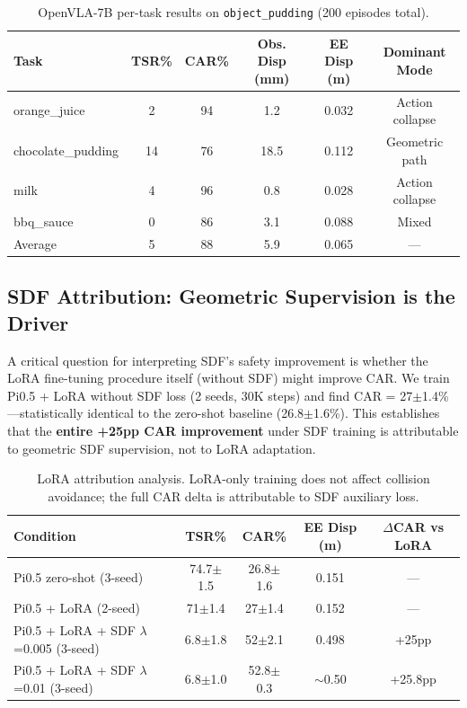 \documentclass[letterpaper]{article}
\begin{document}
\begin{table}[h]
\centering
\caption{OpenVLA-7B per-task results on \texttt{object\_pudding} (200 episodes total).}
\label{tab:openvla_tasks}
\begin{tabular}{lccccc}
\toprule
\textbf{Task} & \textbf{TSR\%} & \textbf{CAR\%} & \textbf{Obs. Disp (mm)} & \textbf{EE Disp (m)} & \textbf{Dominant Mode} \\
\midrule
orange\_juice & 2 & 94 & 1.2 & 0.032 & Action collapse \\
chocolate\_pudding & 14 & 76 & 18.5 & 0.112 & Geometric path \\
milk & 4 & 96 & 0.8 & 0.028 & Action collapse \\
bbq\_sauce & 0 & 86 & 3.1 & 0.088 & Mixed \\
\midrule
Average & 5 & 88 & 5.9 & 0.065 & --- \\
\bottomrule
\end{tabular}
\end{table}

\subsection{SDF Attribution: Geometric Supervision is the Driver}
\label{sec:sdf_training}

A critical question for interpreting SDF's safety improvement is whether the LoRA fine-tuning procedure itself (without SDF) might improve CAR. We train Pi0.5 + LoRA without SDF loss (2 seeds, 30K steps) and find CAR = 27$\pm$1.4\%---statistically identical to the zero-shot baseline (26.8$\pm$1.6\%). This establishes that the \textbf{entire +25pp CAR improvement} under SDF training is attributable to geometric SDF supervision, not to LoRA adaptation.

\begin{table}[h]
\centering
\caption{LoRA attribution analysis. LoRA-only training does not affect collision avoidance; the full CAR delta is attributable to SDF auxiliary loss.}
\label{tab:lora_attribution}
\begin{tabular}{lcccc}
\toprule
\textbf{Condition} & \textbf{TSR\%} & \textbf{CAR\%} & \textbf{EE Disp (m)} & \textbf{$\Delta$CAR vs LoRA} \\
\midrule
Pi0.5 zero-shot (3-seed) & 74.7$\pm$1.5 & 26.8$\pm$1.6 & 0.151 & --- \\
Pi0.5 + LoRA (2-seed) & 71$\pm$1.4 & 27$\pm$1.4 & 0.152 & --- \\
Pi0.5 + LoRA + SDF $\lambda$=0.005 (3-seed) & 6.8$\pm$1.8 & 52$\pm$2.1 & 0.498 & +25pp \\
Pi0.5 + LoRA + SDF $\lambda$=0.01 (3-seed) & 6.8$\pm$1.0 & 52.8$\pm$0.3 & $\sim$0.50 & +25.8pp \\
\bottomrule
\end{tabular}
\end{table}
\end{document}
